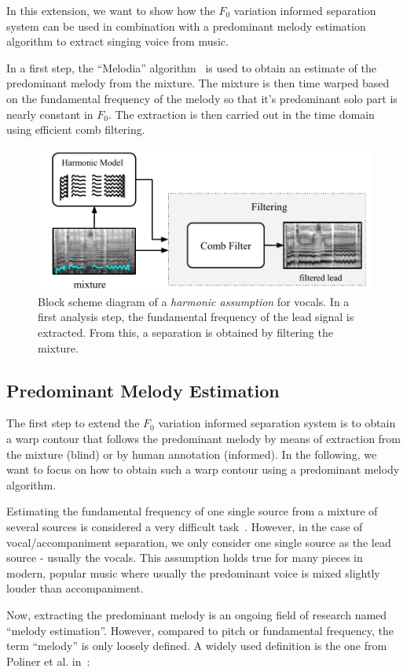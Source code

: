 In this extension, we want to show how the \(F_0\) variation informed separation system can be used in combination with a predominant melody estimation algorithm to extract singing voice from music.

\par
In a first step, the ``Melodia'' algorithm~\cite{salamon12} is used to obtain an estimate of the predominant melody from the mixture.
The mixture is then time warped based on the fundamental frequency of the melody so that it’s predominant solo part is nearly constant in \(F_0\). The extraction is then carried out in the time domain using efficient comb filtering.

\begin{figure}[htbp]
    \centering
  \includegraphics[width=\columnwidth]{Chapters/05_Separation_Known/figures/comb_filter.pdf}
    \caption{Block scheme diagram of a \textit{harmonic assumption} for vocals. In a first analysis step, the fundamental frequency of the lead signal is extracted. From this, a separation is obtained by filtering the mixture.}
    \label{fig:methods_harmonicity}
\end{figure}

\subsection{Predominant Melody Estimation}

The first step to extend the $F_0$ variation informed separation system is to obtain a warp contour that follows the predominant melody by means of extraction from the mixture (blind) or by human annotation (informed).
In the following, we want to focus on how to obtain such a warp contour using a predominant melody algorithm.\par

Estimating the fundamental frequency of one single source from a mixture of several sources is considered a very difficult task~\cite{klapuri08}.
However, in the case of vocal/accompaniment separation, we only consider one single source as the lead source - usually the vocals.
This assumption holds true for many pieces in modern, popular music where usually the predominant voice is mixed slightly louder than accompaniment.
\par
Now, extracting the predominant melody is an ongoing field of research named ``melody estimation''.
However, compared to pitch or fundamental frequency, the term ``melody'' is only loosely defined.
A widely used definition is the one from Poliner et al. in~\cite{poliner07}:

